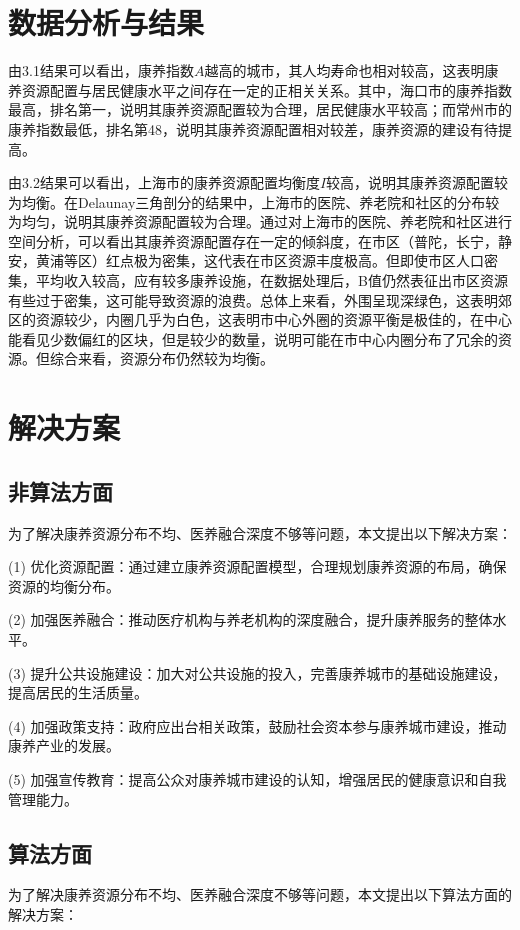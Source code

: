 \documentclass[12pt,a4paper]{article}
\begin{document}
\newpage

\section{数据分析与结果}

由3.1结果可以看出，康养指数$A$越高的城市，其人均寿命也相对较高，这表明康养资源配置与居民健康水平之间存在一定的正相关关系。其中，海口市的康养指数最高，排名第一，说明其康养资源配置较为合理，居民健康水平较高；而常州市的康养指数最低，排名第48，说明其康养资源配置相对较差，康养资源的建设有待提高。

由3.2结果可以看出，上海市的康养资源配置均衡度$I$较高，说明其康养资源配置较为均衡。在Delaunay三角剖分的结果中，上海市的医院、养老院和社区的分布较为均匀，说明其康养资源配置较为合理。通过对上海市的医院、养老院和社区进行空间分析，可以看出其康养资源配置存在一定的倾斜度，在市区（普陀，长宁，静安，黄浦等区）红点极为密集，这代表在市区资源丰度极高。但即使市区人口密集，平均收入较高，应有较多康养设施，在数据处理后，B值仍然表征出市区资源有些过于密集，这可能导致资源的浪费。总体上来看，外围呈现深绿色，这表明郊区的资源较少，内圈几乎为白色，这表明市中心外圈的资源平衡是极佳的，在中心能看见少数偏红的区块，但是较少的数量，说明可能在市中心内圈分布了冗余的资源。但综合来看，资源分布仍然较为均衡。

\section{解决方案}
\subsection{非算法方面}
为了解决康养资源分布不均、医养融合深度不够等问题，本文提出以下解决方案：

(1) 优化资源配置：通过建立康养资源配置模型，合理规划康养资源的布局，确保资源的均衡分布。

(2) 加强医养融合：推动医疗机构与养老机构的深度融合，提升康养服务的整体水平。

(3) 提升公共设施建设：加大对公共设施的投入，完善康养城市的基础设施建设，提高居民的生活质量。

(4) 加强政策支持：政府应出台相关政策，鼓励社会资本参与康养城市建设，推动康养产业的发展。

(5) 加强宣传教育：提高公众对康养城市建设的认知，增强居民的健康意识和自我管理能力。

\subsection{算法方面}
为了解决康养资源分布不均、医养融合深度不够等问题，本文提出以下算法方面的解决方案：
\end{document}
